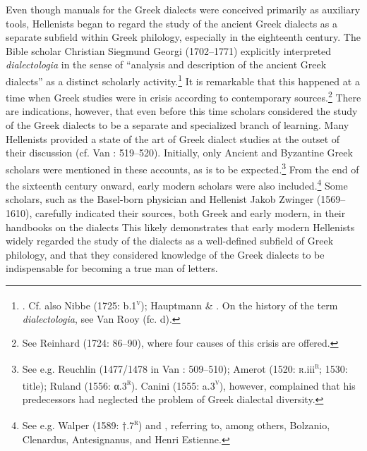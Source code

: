 Even though manuals for the Greek dialects were conceived primarily as auxiliary tools, Hellenists began to regard the study of the ancient Greek dialects as a separate subfield within Greek philology, especially in the eighteenth century. The Bible scholar Christian Siegmund Georgi (1702–1771) explicitly interpreted \textit{dialectologia} in the sense of “analysis and description of the ancient Greek dialects” as a distinct scholarly activity.\footnote{\citet[16]{Georgi1733}. Cf. also Nibbe (1725: b.1\textsc{\textsuperscript{v}}); Hauptmann \& \citet[15]{Schmid1737}. On the history of the term \textit{dialectologia}, see Van Rooy (fc. d).} It is remarkable that this happened at a time when Greek studies were in crisis according to contemporary sources.\footnote{See Reinhard (1724: 86–90), where four causes of this crisis are offered.} There are indications, however, that even before this time scholars considered the study of the Greek dialects to be a separate and specialized branch of learning. Many Hellenists provided a state of the art of Greek dialect studies at the outset of their discussion (cf. Van \citealt{Rooy2014}: 519–520). Initially, only Ancient and Byzantine Greek scholars were mentioned in these accounts, as is to be expected.\footnote{See e.g. Reuchlin (1477/1478 in Van \citealt{Rooy2014}: 509–510); Amerot (1520: \textsc{r.}iii\textsc{\textsuperscript{r}}\textsc{;} \textsc{1530:} title); Ruland (1556: α.3\textsc{\textsuperscript{r}}). Canini (1555: a.3\textsc{\textsuperscript{v}}), however, complained that his predecessors had neglected the problem of Greek dialectal diversity.} From the end of the sixteenth century onward, early modern scholars were also included.\footnote{See e.g. Walper (1589: †.7\textsc{\textsuperscript{r}}) and \citet[1]{Schmidt1604}, referring to, among others, Bolzanio, Clenardus, Antesignanus, and Henri Estienne.} Some scholars, such as the Basel-born physician and Hellenist Jakob Zwinger (1569–1610), carefully indicated their sources, both Greek and early modern, in their handbooks on the dialects \citep{Zwinger1605} This likely demonstrates that early modern Hellenists widely regarded the study of the dialects as a well-defined subfield of Greek philology, and that they considered knowledge of the Greek dialects to be indispensable for becoming a true man of letters.

